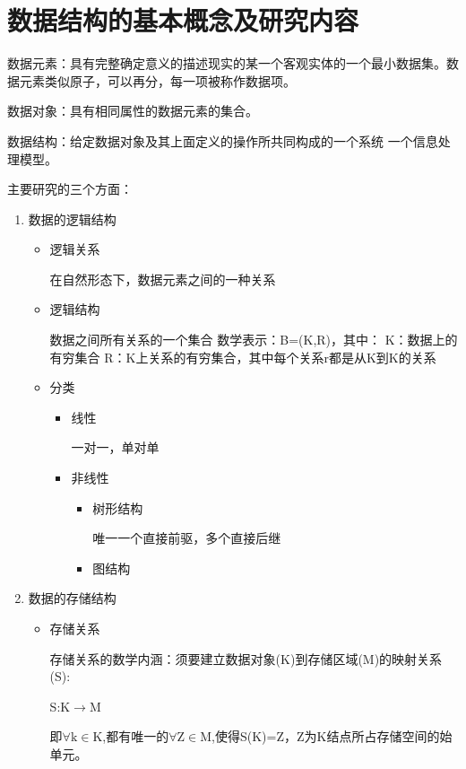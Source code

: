\documentclass[AutoFakeBold]{LZUThesis2007}
\begin{document}
    \section{数据结构的基本概念及研究内容}

	数据元素：具有完整确定意义的描述现实的某一个客观实体的一个最小数据集。数据元素类似原子，可以再分，每一项被称作数据项。

	数据对象：具有相同属性的数据元素的集合。

	数据结构：给定数据对象及其上面定义的操作所共同构成的一个系统 一个信息处理模型。

	主要研究的三个方面：
\begin{enumerate}
	\item 数据的逻辑结构
		\begin{itemize}
		\item  逻辑关系
	
					在自然形态下，数据元素之间的一种关系
	
		\item  逻辑结构
	
					数据之间所有关系的一个集合
				数学表示：B=(K,R)，其中：
				K：数据上的有穷集合
				R：K上关系的有穷集合，其中每个关系r都是从K到K的关系
	
		\item  分类
	
			\begin{itemize}
				\item  线性
						
							一对一，单对单
		
				\item  非线性
				\begin{itemize}
					\item  树形结构
		
								唯一一个直接前驱，多个直接后继
		
					\item  图结构
				\end{itemize}
			\end{itemize}
		\end{itemize}

	\item 数据的存储结构
			\begin{itemize}
				\item  存储关系
	
							存储关系的数学内涵：须要建立数据对象(K)到存储区域(M)的映射关系(S):

							S:K$\rightarrow$M

							即$\forall \mathrm{k} \in \mathrm{K}$,都有唯一的$\forall \mathrm{Z} \in \mathrm{M}$,使得S(K)=Z，Z为K结点所占存储空间的始单元。


\end{itemize}
\end{enumerate}
\end{document}
